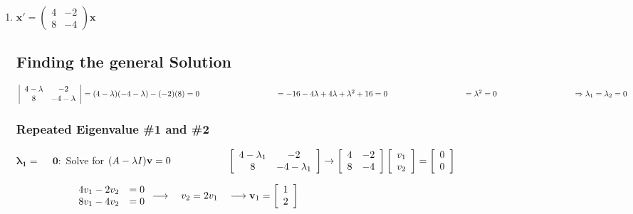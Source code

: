\documentclass[12pt]{article}
\begin{document}
\begin{enumerate}
    \item[b)] $\mathbf{x'} = \begin{pmatrix} 4 & -2 \\ 8 & -4 \end{pmatrix} \mathbf{x}$
    \subsection*{Finding the general Solution}
    $\left| \begin{array}{cc} 4 - \lambda & -2\\ 8 & -4 - \lambda\end{array}\right| 
    = (4 - \lambda)(-4 - \lambda) - (-2)(8) = 0 \\\\
    \hspace*{95pt} = -16 - 4\lambda + 4\lambda + \lambda^2 + 16 = 0 \\\\
    \hspace*{95pt} = \lambda^2 = 0 \\\\
    \hspace*{95pt} \Rightarrow \lambda_1 = \lambda_2 = 0$

    \subsubsection*{Repeated Eigenvalue \#1 and \#2}
    $\mathbf{\lambda_1 = \phantom{-}0}:$ Solve for $(A - \lambda I)\mathbf{v} = 0 \\
    \hspace*{2cm}\left[\begin{array}{cc} 4 - \lambda_1 & -2\\ 8 & -4 - \lambda_1\end{array}\right]
    \rightarrow \left[\begin{array}{rr} 4& -2\\ 8 & -4 \end{array}\right] \left[\begin{array}{cc} v_1 \\ v_2 \end{array}\right] = \left[\begin{array}{cc} 0 \\ 0 \end{array}\right]$

    $\hspace*{2cm}\begin{array}{rr} 4v_1 - 2v_2 &=0 \\ 8v_1 - 4v_2 &=0 \end{array} 
     \longrightarrow \quad v_2=2v_1 \quad \longrightarrow \mathbf{v}_1 =\left[\begin{array}{cc} 1 \\ 2 \end{array}\right]$ \\


\end{enumerate}
\end{document}
